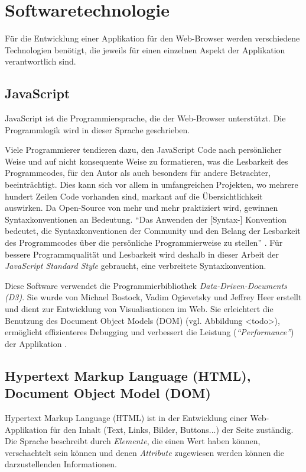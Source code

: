 \section{Softwaretechnologie}

Für die Entwicklung einer Applikation für den Web-Browser werden verschiedene Technologien benötigt, die jeweils für einen einzelnen Aspekt der Applikation verantwortlich sind.

\subsection{JavaScript}

JavaScript ist die Programmiersprache, die der Web-Browser unterstützt. Die Programmlogik wird in dieser Sprache geschrieben.

Viele Programmierer tendieren dazu, den JavaScript Code nach persönlicher Weise und auf nicht konsequente Weise zu formatieren, was die Lesbarkeit des Programmcodes, für den Autor als auch besonders für andere Betrachter, beeinträchtigt. Dies kann sich vor allem in umfangreichen Projekten, wo mehrere hundert Zeilen Code vorhanden sind, markant auf die Übersichtlichkeit auswirken. Da Open-Source von mehr und mehr praktiziert wird, gewinnen Syntaxkonventionen an Bedeutung. "`Das Anwenden der [Syntax-] Konvention bedeutet, die Syntaxkonventionen der Community und den Belang der Lesbarkeit des Programmcodes über die persönliche Programmierweise zu stellen"' \cite{feross}. Für bessere Programmqualität und Lesbarkeit wird deshalb in dieser Arbeit der \textit{JavaScript Standard Style} gebraucht, eine verbreitete Syntaxkonvention.

Diese Software verwendet die Programmierbibliothek \textit{Data-Driven-Documents (D3)}. Sie wurde von Michael Bostock, Vadim Ogievetsky und Jeffrey Heer erstellt und dient zur Entwicklung von Visualisationen im Web. Sie erleichtert die Benutzung des Document Object Models (DOM) (vgl. Abbildung <todo>), ermöglicht effizienteres Debugging und verbessert die Leistung (\textit{"`Performance"'}) der Applikation \cite{bostock}.

\subsection{Hypertext Markup Language (HTML), Document Object Model (DOM)}

Hypertext Markup Language (HTML) ist in der Entwicklung einer Web-Applikation für den Inhalt (Text, Links, Bilder, Buttons...) der Seite zuständig. Die Sprache beschreibt durch \textit{Elemente}, die einen Wert haben können, verschachtelt sein können und denen \textit{Attribute} zugewiesen werden können die darzustellenden Informationen. 

